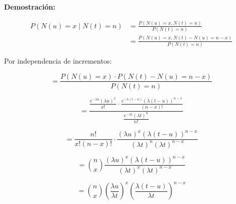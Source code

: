 \documentclass[12pt,a4paper]{article}
\begin{document}
\begin{center}
\end{center}

\textbf{Demostración:}

\begin{align*}
P(N(u) = x \mid N(t) = n) &= \frac{P(N(u) = x, N(t) = n)}{P(N(t) = n)} \\
&= \frac{P(N(u) = x, N(t) - N(u) = n - x)}{P(N(t) = n)}
\end{align*}

Por independencia de incrementos:

\begin{equation*}
= \frac{P(N(u) = x) \cdot P(N(t) - N(u) = n - x)}{P(N(t) = n)}
\end{equation*}

\begin{equation*}
= \frac{\frac{e^{-\lambda u} (\lambda u)^x}{x!} \cdot \frac{e^{-\lambda(t-u)} (\lambda(t-u))^{n-x}}{(n-x)!}}{\frac{e^{-\lambda t} (\lambda t)^n}{n!}}
\end{equation*}

\begin{equation*}
= \frac{n!}{x!(n-x)!} \cdot \frac{(\lambda u)^x (\lambda(t-u))^{n-x}}{(\lambda t)^n (\lambda t)^{n-x}}
\end{equation*}

\begin{equation*}
= \binom{n}{x} \frac{(\lambda u)^x (\lambda(t-u))^{n-x}}{(\lambda t)^x (\lambda t)^{n-x}}
\end{equation*}

\begin{equation*}
= \binom{n}{x} \left(\frac{\lambda u}{\lambda t}\right)^x \left(\frac{\lambda(t-u)}{\lambda t}\right)^{n-x}
\end{equation*}
\end{document}
